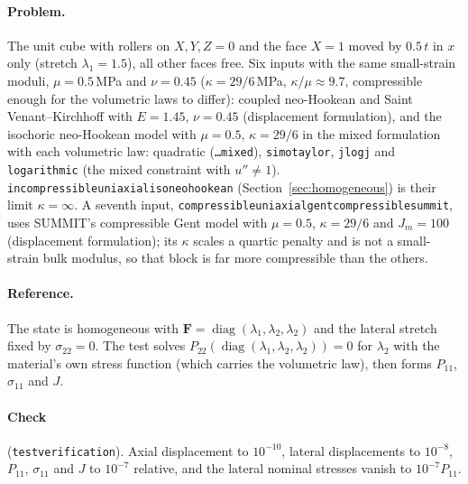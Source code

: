 \documentclass[11pt]{article}
\newcommand{\diag}{\operatorname{diag}}
\newcommand{\bF}{\bm{F}}
\DeclareRobustCommand{\code}[1]{{\def\_{\textunderscore\allowbreak}\texttt{#1}}}
\DeclareRobustCommand{\file}[1]{{\def\_{\textunderscore\allowbreak}\texttt{#1}}}
\begin{document}
\paragraph{Problem.}
The unit cube with rollers on $X, Y, Z = 0$ and the face $X = 1$ moved by
$0.5\,t$ in $x$ only (stretch $\lambda_1 = 1.5$), all other faces free.
Six inputs with the same small-strain moduli, $\mu = 0.5$\,MPa and
$\nu = 0.45$ ($\kappa = 29/6$\,MPa, $\kappa/\mu \approx 9.7$, compressible
enough for the volumetric laws to differ): coupled neo-Hookean and
Saint Venant--Kirchhoff with $E = 1.45$, $\nu = 0.45$ (displacement
formulation), and the isochoric neo-Hookean model with $\mu = 0.5$,
$\kappa = 29/6$ in the mixed formulation with each volumetric law:
quadratic (\file{\ldots\_mixed}), \code{simo\_taylor}, \code{j\_log\_j} and
\code{logarithmic} (the mixed constraint with $u'' \ne 1$).
\file{incompressible\_uniaxial\_iso\_neo\_hookean}
(Section~\ref{sec:homogeneous}) is their limit $\kappa = \infty$.  A
seventh input, \file{compressible\_uniaxial\_gent\_compressible\_summit},
uses SUMMIT's compressible Gent model with $\mu = 0.5$, $\kappa = 29/6$ and
$J_m = 100$ (displacement formulation); its $\kappa$ scales a quartic
penalty and is not a small-strain bulk modulus, so that block is far more
compressible than the others.

\paragraph{Reference.}
The state is homogeneous with $\bF = \diag(\lambda_1, \lambda_2, \lambda_2)$
and the lateral stretch fixed by $\sigma_{22} = 0$.  The test solves
$P_{22}(\diag(\lambda_1, \lambda_2, \lambda_2)) = 0$ for $\lambda_2$ with
the material's own stress function (which carries the volumetric law), then
forms $P_{11}$, $\sigma_{11}$ and $J$.

\paragraph{Check} (\file{test\_verification}).  Axial displacement to
$10^{-10}$, lateral displacements to $10^{-8}$, $P_{11}$, $\sigma_{11}$ and
$J$ to $10^{-7}$ relative, and the lateral nominal stresses vanish to
$10^{-7}P_{11}$.
\end{document}
